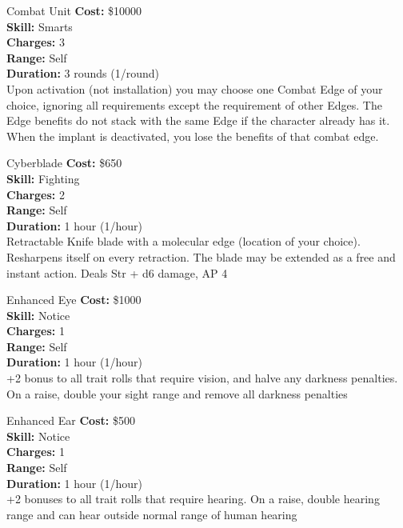 \begin{multicols}{2}
\begin{genericsection}{Combat Unit}
\textbf{Cost:} \$10000\\
\textbf{Skill:} Smarts\\
\textbf{Charges:} 3\\
\textbf{Range:} Self\\
\textbf{Duration:} 3 rounds (1/round)\\
Upon activation (not installation) you may choose one Combat Edge of your choice, ignoring all requirements except the requirement of other Edges. The Edge benefits do not stack with the same Edge if the character already has it. When the implant is deactivated, you lose the benefits of that combat edge.
\end{genericsection}

\begin{genericsection}{Cyberblade}
\textbf{Cost:} \$650\\
\textbf{Skill:} Fighting\\
\textbf{Charges:} 2\\
\textbf{Range:} Self\\
\textbf{Duration:} 1 hour (1/hour)\\
Retractable Knife blade with a molecular edge (location of your choice). Resharpens itself on every retraction. The blade may be extended as a free and instant action. Deals Str + d6 damage, AP 4
\end{genericsection}

\begin{genericsection}{Enhanced Eye}
\textbf{Cost:} \$1000\\
\textbf{Skill:} Notice\\
\textbf{Charges:} 1\\
\textbf{Range:} Self\\
\textbf{Duration:} 1 hour (1/hour)\\
+2 bonus to all trait rolls that require vision, and halve any darkness penalties. On a raise, double your sight range and remove all darkness penalties
\end{genericsection}

\begin{genericsection}{Enhanced Ear}
\textbf{Cost:} \$500\\
\textbf{Skill:} Notice\\
\textbf{Charges:} 1\\
\textbf{Range:} Self\\
\textbf{Duration:} 1 hour (1/hour)\\
+2 bonuses to all trait rolls that require hearing. On a raise, double hearing range and can hear outside normal range of human hearing
\end{genericsection}


\end{multicols}
